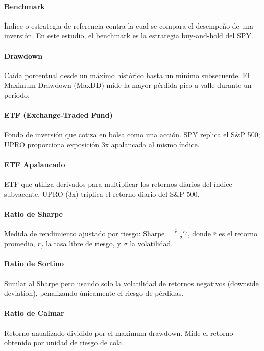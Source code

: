 \documentclass[11pt,a4paper]{article}
\begin{document}
\paragraph{Benchmark} \label{glos:benchmark}
Índice o estrategia de referencia contra la cual se compara el desempeño de una inversión. En este estudio, el benchmark es la estrategia buy-and-hold del SPY.

\paragraph{Drawdown} \label{glos:drawdown}
Caída porcentual desde un máximo histórico hasta un mínimo subsecuente. El Maximum Drawdown (MaxDD) mide la mayor pérdida pico-a-valle durante un período.

\paragraph{ETF (Exchange-Traded Fund)} \label{glos:etf}
Fondo de inversión que cotiza en bolsa como una acción. SPY replica el S\&P 500; UPRO proporciona exposición 3x apalancada al mismo índice.

\paragraph{ETF Apalancado} \label{glos:etf-apalancado}
ETF que utiliza derivados para multiplicar los retornos diarios del índice subyacente. UPRO (3x) triplica el retorno diario del S\&P 500.

\paragraph{Ratio de Sharpe} \label{glos:sharpe}
Medida de rendimiento ajustado por riesgo: $\text{Sharpe} = \frac{\bar{r} - r_f}{\sigma}$, donde $\bar{r}$ es el retorno promedio, $r_f$ la tasa libre de riesgo, y $\sigma$ la volatilidad.

\paragraph{Ratio de Sortino} \label{glos:sortino}
Similar al Sharpe pero usando solo la volatilidad de retornos negativos (downside deviation), penalizando únicamente el riesgo de pérdidas.

\paragraph{Ratio de Calmar} \label{glos:calmar}
Retorno anualizado dividido por el maximum drawdown. Mide el retorno obtenido por unidad de riesgo de cola.
\end{document}
